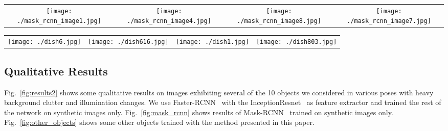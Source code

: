 \documentclass[10pt,twocolumn,letterpaper]{article}
\newcommand{\imgspace}[0]{\hspace{-0.3cm}}
\newcommand{\asus}[0]{AsusXtionPROLive\xspace}
\begin{document}
\begin{figure*}
\begin{center}
\begin{tabular}{cccc}
\texttt{[image: ./mask\_rcnn\_image1.jpg]} & \imgspace
\texttt{[image: ./mask\_rcnn\_image4.jpg]} & \imgspace
\texttt{[image: ./mask\_rcnn\_image8.jpg]} & \imgspace
\texttt{[image: ./mask\_rcnn\_image7.jpg]} \\
\end{tabular}
\end{center}
\caption{\label{fig:mask_rcnn} Results of  Mask-RCNN~\cite{mask_rcnn} trained on
  synthetic images only with the feature extractor frozen. The images were taken
  with the \asus camera in a highly cluttered environment under various poses.}
\end{figure*}

\begin{figure*}[!]
\begin{center}
\begin{tabular}{cccc}
\texttt{[image: ./dish6.jpg]} & \imgspace
\texttt{[image: ./dish616.jpg]} & \imgspace
\texttt{[image: ./dish1.jpg]} & \imgspace
\texttt{[image: ./dish803.jpg]} \\
\end{tabular}
\end{center}
\caption{\label{fig:other_objects} Objects with similar shapes and colors
  detected in challenging environments. The detector was trained on
  synthetic images only.}
\end{figure*}


\subsection{Qualitative Results}
\label{sec:images}

Fig.~\ref{fig:results2}  shows some  qualitative  results  on images  exhibiting
several of the  10 objects we considered in various  poses with heavy background
clutter         and         illumination        changes.          We         use Faster-RCNN~\cite{faster_rcnn} with the
InceptionResnet~\cite{inception_resnet}  as feature  extractor  and trained  the
rest of  the network on  synthetic images only.   Fig.~\ref{fig:mask_rcnn} shows
results    of     Mask-RCNN~\cite{mask_rcnn}    trained         on     synthetic
images only.
Fig.~\ref{fig:other_objects} shows  some other  objects trained with  the method
presented in this paper.
\end{document}
